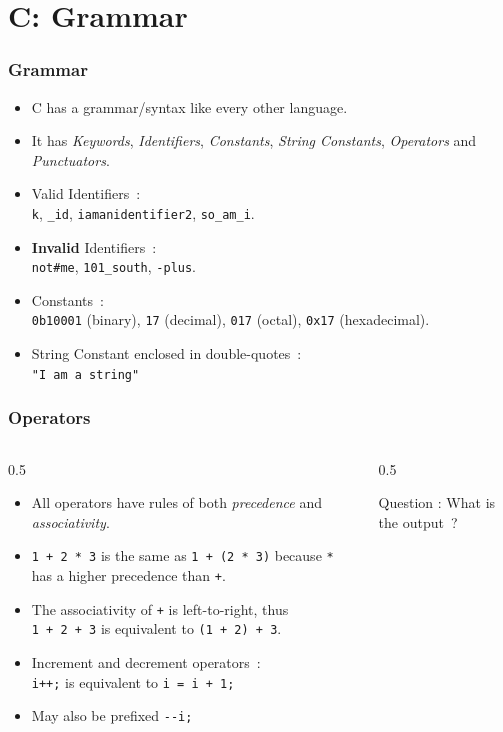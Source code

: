 \section{C: Grammar}

\begin{frame}[fragile]
\frametitle{Grammar}
\begin{itemize}[<+->]
\item  C has a grammar/syntax like every other language.
\item  It has {\it Keywords}, {\it Identifiers}, {\it Constants}, {\it String Constants}, {\it Operators} and {\it Punctuators}.
\item
Valid Identifiers~:\\
\verb+k+,
\verb+_id+,
\verb+iamanidentifier2+,
\verb+so_am_i+.
\item  {\bf Invalid} Identifiers~:\\
\verb+not#me+,
\verb+101_south+,
\verb+-plus+.
\item  Constants~:\\
\verb+0b10001+ (binary),
\verb+17+ (decimal),
\verb+017+ (octal),
\verb+0x17+ (hexadecimal).
\item  String Constant enclosed in double-quotes~:\\
\verb+"I am a string"+
\end{itemize}
\end{frame}

\begin{frame}[fragile]
\frametitle{Operators}

\begin{columns}
\begin{column}{0.5\textwidth}
\begin{itemize}[<+->]
\item All operators have rules of both {\it precedence}
and {\it associativity}.
\item  \verb$1 + 2 * 3$ is the same as
\verb$1 + (2 * 3)$ because \verb$*$ has
a higher precedence than \verb$+$.
\item  The associativity of \verb$+$ is left-to-right, thus\\
\verb$1 + 2 + 3$ is equivalent to
\verb$(1 + 2) + 3$.
\item  Increment and decrement operators~:\\
\verb$i++;$ is equivalent to \verb$i = i + 1;$
\item  May also be prefixed \verb$--i;$
\end{itemize}
\end{column}

\pause
\begin{column}{0.5\textwidth}

{Question : What is the output~?}
\end{column}

\end{columns}
\end{frame}

